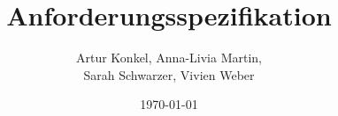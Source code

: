 %
%

\newcommand{\fullname}{Artur Konkel, Anna-Livia Martin,\\ Sarah Schwarzer, Vivien Weber}
\newcommand{\fakultaet}{Medieninformatik}

\newcommand{\titel}{Anforderungsspezifikation}

\newcommand{\von}{29.04.2024}
\newcommand{\bis}{08.07.2024}

\newcommand{\abgabedatum}{08.07.2024}
\newcommand{\aktuellerStand}{14.06.2024}

\title{Anforderungsspezifikation}
\author{\fullname}
\date{\today}